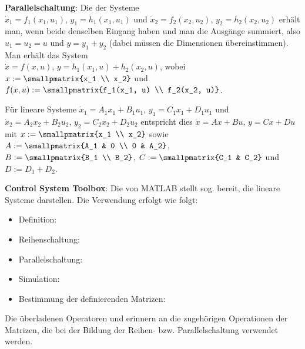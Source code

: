 \linie

\textbf{Parallelschaltung}:
Die  der Systeme\\
$\dot{x}_1 = f_1(x_1, u_1)$, $y_1 = h_1(x_1, u_1)$ und
$\dot{x}_2 = f_2(x_2, u_2)$, $y_2 = h_2(x_2, u_2)$
erhält man, wenn beide denselben Eingang haben und man die Ausgänge summiert,
also $u_1 = u_2 = u$ und $y = y_1 + y_2$
(dabei müssen die Dimensionen übereinstimmen).
Man erhält das System\\
$\dot{x} = f(x, u)$, $y = h_1(x_1, u) + h_2(x_2, u)$,
wobei $x := \smallpmatrix{x_1 \\ x_2}$ und
$f(x, u) := \smallpmatrix{f_1(x_1, u) \\ f_2(x_2, u)}$.

Für lineare Systeme
$\dot{x}_1 = A_1 x_1 + B_1 u_1$, $y_1 = C_1 x_1 + D_1 u_1$ und\\
$\dot{x}_2 = A_2 x_2 + B_2 u_2$, $y_2 = C_2 x_2 + D_2 u_2$ entspricht dies
$\dot{x} = Ax + Bu$, $y = Cx + Du$\\
mit $x := \smallpmatrix{x_1 \\ x_2}$ sowie
$A := \smallpmatrix{A_1 & 0 \\ 0 & A_2}$,
$B := \smallpmatrix{B_1 \\ B_2}$,
$C := \smallpmatrix{C_1 & C_2}$ und
$D := D_1 + D_2$.

\linie
\pagebreak

\textbf{Control System Toolbox}:
Die  von MATLAB stellt sog.  bereit,
die lineare Systeme darstellen.
Die Verwendung erfolgt wie folgt:
\begin{itemize}
    \item
    Definition: 

    \item
    Reihenschaltung: 

    \item
    Parallelschaltung: 

    \item
    Simulation: 

    \item
    Bestimmung der definierenden Matrizen: 
\end{itemize}
Die überladenen Operatoren \code{*} und \code{+} erinnern an die zugehörigen Operationen
der Matrizen, die bei der Bildung der Reihen- bzw. Parallelschaltung verwendet werden.

